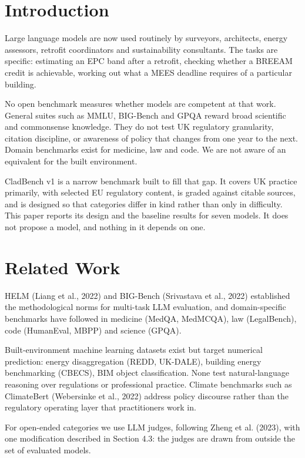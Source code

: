 \documentclass[11pt,a4paper]{article}
\begin{document}
\section{Introduction}

Large language models are now used routinely by surveyors, architects, energy assessors, retrofit coordinators and sustainability consultants. The tasks are specific: estimating an EPC band after a retrofit, checking whether a BREEAM credit is achievable, working out what a MEES deadline requires of a particular building.

No open benchmark measures whether models are competent at that work. General suites such as MMLU, BIG-Bench and GPQA reward broad scientific and commonsense knowledge. They do not test UK regulatory granularity, citation discipline, or awareness of policy that changes from one year to the next. Domain benchmarks exist for medicine, law and code. We are not aware of an equivalent for the built environment.

CladBench v1 is a narrow benchmark built to fill that gap. It covers UK practice primarily, with selected EU regulatory content, is graded against citable sources, and is designed so that categories differ in kind rather than only in difficulty. This paper reports its design and the baseline results for seven models. It does not propose a model, and nothing in it depends on one.


\section{Related Work}

HELM (Liang et al., 2022) and BIG-Bench (Srivastava et al., 2022) established the methodological norms for multi-task LLM evaluation, and domain-specific benchmarks have followed in medicine (MedQA, MedMCQA), law (LegalBench), code (HumanEval, MBPP) and science (GPQA).

Built-environment machine learning datasets exist but target numerical prediction: energy disaggregation (REDD, UK-DALE), building energy benchmarking (CBECS), BIM object classification. None test natural-language reasoning over regulations or professional practice. Climate benchmarks such as ClimateBert (Webersinke et al., 2022) address policy discourse rather than the regulatory operating layer that practitioners work in.

For open-ended categories we use LLM judges, following Zheng et al. (2023), with one modification described in Section 4.3: the judges are drawn from outside the set of evaluated models.
\end{document}

